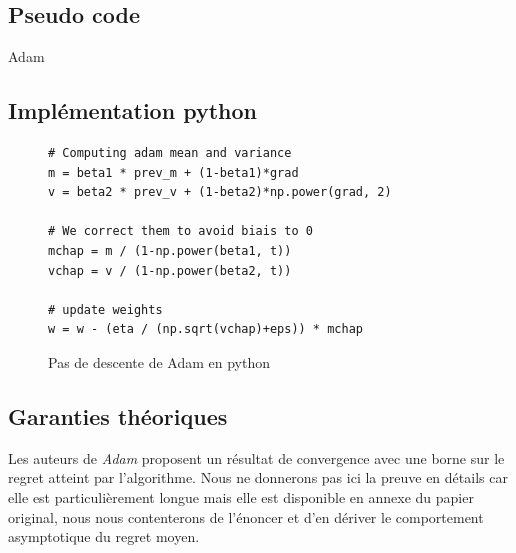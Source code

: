 \documentclass[fleqn,11pt, titlepage, french]{article}
\begin{document}
	\subsection{Pseudo code}
	\begin{algorithm}[H]
		\begin{algorithmic}
			
			
				
			\ENDWHILE
		\end{algorithmic}
	\caption{Adam}
	\end{algorithm}

	\subsection{Implémentation python}
	
	\begin{figure}[H]
		\centering
\begin{verbatim}
# Computing adam mean and variance
m = beta1 * prev_m + (1-beta1)*grad
v = beta2 * prev_v + (1-beta2)*np.power(grad, 2)

# We correct them to avoid biais to 0
mchap = m / (1-np.power(beta1, t))
vchap = v / (1-np.power(beta2, t))

# update weights
w = w - (eta / (np.sqrt(vchap)+eps)) * mchap
		\end{verbatim}
		\caption{Pas de descente de Adam en python}
	\end{figure}

	\subsection{Garanties théoriques}
	
	Les auteurs de \emph{Adam} proposent un résultat de convergence avec une borne sur le regret atteint par l'algorithme. Nous ne donnerons pas ici la preuve en détails car elle est particulièrement longue mais elle est disponible en annexe du papier original\cite{adam}, nous nous contenterons de l'énoncer et d'en dériver le comportement asymptotique du regret moyen.
	
\end{document}
